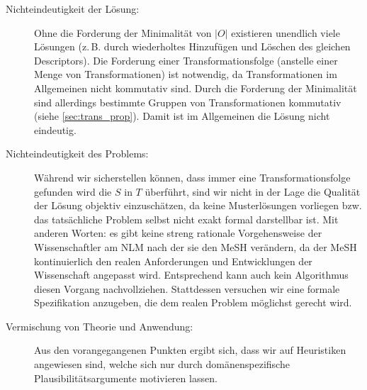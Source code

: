 \begin{description}
 \item[Nichteindeutigkeit der Lösung:] Ohne die Forderung der Minimalität von $|O|$ existieren unendlich viele Lösungen (z.\,B. durch wiederholtes Hinzufügen und Löschen des gleichen Descriptors). Die Forderung einer Transformationsfolge (anstelle einer Menge von Transformationen) ist notwendig, da Transformationen im Allgemeinen nicht kommutativ sind. Durch die Forderung der Minimalität sind allerdings bestimmte Gruppen von Transformationen kommutativ (siehe \autoref{sec:trans_prop}). Damit ist im Allgemeinen die Lösung nicht eindeutig.

 \item[Nichteindeutigkeit des Problems:] Während wir sicherstellen können, dass immer eine Transformationsfolge gefunden wird die $S$ in $T$ überführt, sind wir nicht in der Lage die Qualität der Lösung objektiv einzuschätzen, da keine Musterlösungen vorliegen bzw. das tatsächliche Problem selbst nicht exakt formal darstellbar ist. Mit anderen Worten: es gibt keine streng rationale Vorgehensweise der Wissenschaftler am NLM nach der sie den MeSH verändern, da der MeSH kontinuierlich den realen Anforderungen und Entwicklungen der Wissenschaft angepasst wird. Entsprechend kann auch kein Algorithmus diesen Vorgang nachvollziehen. Stattdessen versuchen wir eine formale Spezifikation anzugeben, die dem realen Problem möglichst gerecht wird. 

 \item[Vermischung von Theorie und Anwendung:] Aus den vorangegangenen Punkten ergibt sich, dass wir auf Heuristiken angewiesen sind, welche sich nur durch domänenspezifische Plausibilitätsargumente motivieren lassen.
\end{description}



